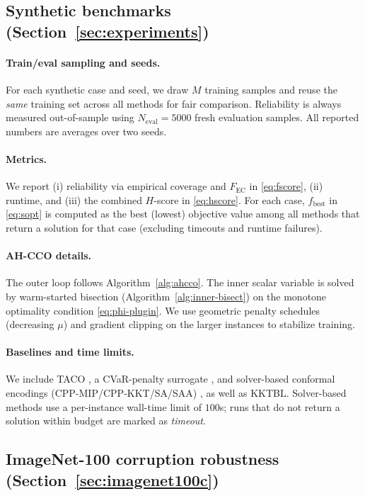 \documentclass{uai2026} %
\theoremstyle{plain}
\theoremstyle{definition}
\begin{document}
\subsection{Synthetic benchmarks (Section~\ref{sec:experiments})}
\paragraph{Train/eval sampling and seeds.}
For each synthetic case and seed, we draw $M$ training samples and reuse the \emph{same} training set across all methods for fair comparison.
Reliability is always measured out-of-sample using $N_{\mathrm{eval}}=5000$ fresh evaluation samples.
All reported numbers are averages over two seeds.

\paragraph{Metrics.}
We report (i) reliability via empirical coverage and $F_{\mathrm{EC}}$ in \eqref{eq:fscore}, (ii) runtime, and (iii) the combined $H$-score in \eqref{eq:hscore}.
For each case, $f_{\mathrm{best}}$ in \eqref{eq:sopt} is computed as the best (lowest) objective value among all methods that return a solution for that case (excluding timeouts and runtime failures).

\paragraph{AH-CCO details.}
The outer loop follows Algorithm~\ref{alg:ahcco}.
The inner scalar variable is solved by warm-started bisection (Algorithm~\ref{alg:inner-bisect}) on the monotone optimality condition \eqref{eq:phi-plugin}.
We use geometric penalty schedules (decreasing $\mu$) and gradient clipping on the larger instances to stabilize training.

\paragraph{Baselines and time limits.}
We include TACO \citep{laguelmalickackooij2021bilevel}, a CVaR-penalty surrogate \citep{rockafellaruryasev2000cvar}, and solver-based conformal encodings (CPP-MIP/CPP-KKT/SA/SAA) \citep{zhao2024conformal}, as well as KKTBL.
Solver-based methods use a per-instance wall-time limit of $100$s; runs that do not return a solution within budget are marked as \textit{timeout}.

\subsection{ImageNet-100 corruption robustness (Section~\ref{sec:imagenet100c})}
\end{document}
